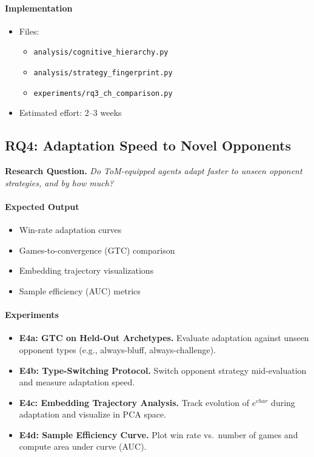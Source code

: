 \documentclass{article}
\begin{document}
\paragraph{Implementation}
\begin{itemize}
    \item Files:
    \begin{itemize}
        \item \texttt{analysis/cognitive\_hierarchy.py}
        \item \texttt{analysis/strategy\_fingerprint.py}
        \item \texttt{experiments/rq3\_ch\_comparison.py}
    \end{itemize}
    \item Estimated effort: 2--3 weeks
\end{itemize}

\subsection{RQ4: Adaptation Speed to Novel Opponents}

\textbf{Research Question.}  
\emph{Do ToM-equipped agents adapt faster to unseen opponent strategies, and by how much?}

\paragraph{Expected Output}
\begin{itemize}
    \item Win-rate adaptation curves
    \item Games-to-convergence (GTC) comparison
    \item Embedding trajectory visualizations
    \item Sample efficiency (AUC) metrics
\end{itemize}

\paragraph{Experiments}
\begin{itemize}
    \item \textbf{E4a: GTC on Held-Out Archetypes.}  
    Evaluate adaptation against unseen opponent types (e.g., always-bluff, always-challenge).

    \item \textbf{E4b: Type-Switching Protocol.}  
    Switch opponent strategy mid-evaluation and measure adaptation speed.

    \item \textbf{E4c: Embedding Trajectory Analysis.}  
    Track evolution of $e^{char}$ during adaptation and visualize in PCA space.

    \item \textbf{E4d: Sample Efficiency Curve.}  
    Plot win rate vs.\ number of games and compute area under curve (AUC).
\end{itemize}
\end{document}
